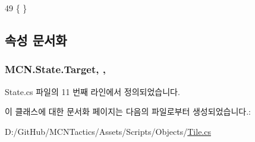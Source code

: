 \begin{DoxyCode}
49 \{ \}
\end{DoxyCode}


\subsection{속성 문서화}
\subsubsection[{\texorpdfstring{Target}{Target}}]{ M\+C\+N.\+State.\+Target\hspace{0.3cm}{\ttfamily [get]}, {\ttfamily [protected]}, {\ttfamily [inherited]}}\hypertarget{class_m_c_n_1_1_state_a79a563b32f183c9adc9a96679fc57eb8}{}\label{class_m_c_n_1_1_state_a79a563b32f183c9adc9a96679fc57eb8}


State.\+cs 파일의 11 번째 라인에서 정의되었습니다.



이 클래스에 대한 문서화 페이지는 다음의 파일로부터 생성되었습니다.\+:\begin{DoxyCompactItemize}
\item 
D\+:/\+Git\+Hub/\+M\+C\+N\+Tactics/\+Assets/\+Scripts/\+Objects/\hyperlink{_tile_8cs}{Tile.\+cs}\end{DoxyCompactItemize}
